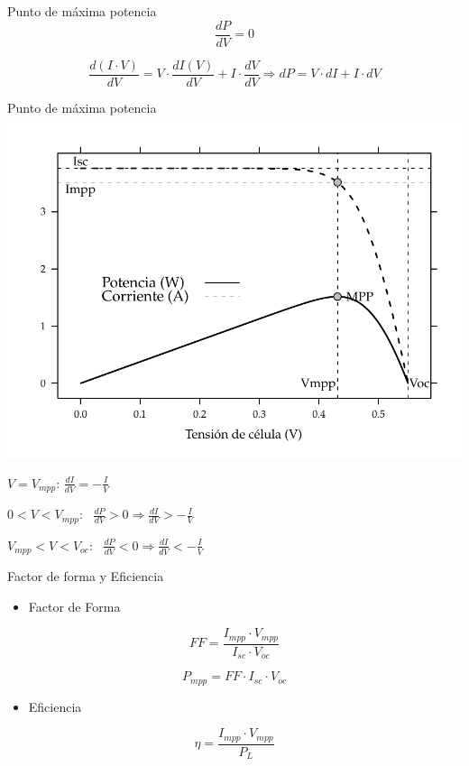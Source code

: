 \documentclass[xcolor={usenames,svgnames,dvipsnames}]{beamer}
\begin{document}
\begin{frame}[label=sec-3-1-3]{Punto de máxima potencia}
$$\frac{dP}{dV}=0$$

$$\frac{d(I\cdot
  V)}{dV}=V\cdot\frac{dI(V)}{dV}+I\cdot\frac{dV}{dV}\Rightarrow
dP=V\cdot dI+I\cdot dV$$
\end{frame}



\begin{frame}[label=sec-3-1-4]{Punto de máxima potencia}
\includegraphics[width=.9\linewidth]{../figs/CurvaIV_Ta20_G800.pdf}

$V=V_{mpp}:\,\frac{dI}{dV}=-\frac{I}{V}$

$0<V<V_{mpp}$:  $\frac{dP}{dV}>0\Rightarrow\frac{dI}{dV}>-\frac{I}{V}$

$V_{mpp}<V<V_{oc}$: 
$\frac{dP}{dV}<0\Rightarrow\frac{dI}{dV}<-\frac{I}{V}$
\end{frame}

\begin{frame}[label=sec-3-1-5]{Factor de forma y Eficiencia}
\begin{itemize}
\item Factor de Forma
\end{itemize}
$$FF=\frac{I_{mpp}\cdot V_{mpp}}{I_{sc}\cdot V_{oc}}$$

$$P_{mpp}=FF\cdot I_{sc}\cdot V_{oc}$$

\begin{itemize}
\item Eficiencia
\end{itemize}

$$\eta=\frac{I_{mpp}\cdot V_{mpp}}{P_{L}}$$
\end{frame}
\end{document}
